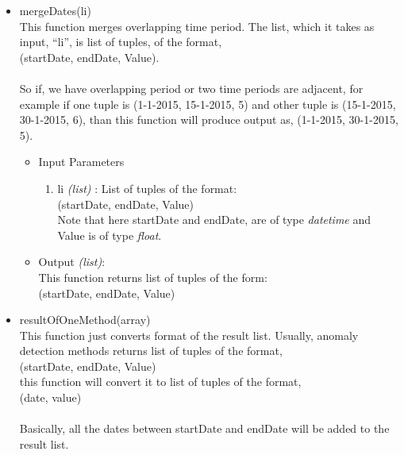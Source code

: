 \begin{itemize}
\begin{itemize}
 \end{itemize}
 
 
 
 
  \item mergeDates(li) \\
  
  
  This function merges overlapping time period. The list, which it takes as 
input, ``li'', is list of tuples, of the format, \\
  (startDate, endDate, Value). \\
  \\
  So if, we have overlapping period or two time periods are adjacent, for 
example if one tuple is (1-1-2015, 15-1-2015, 5) and other tuple is (15-1-2015, 
30-1-2015, 6), than this function will produce output as, 
(1-1-2015, 30-1-2015, 5).
  
  \begin{itemize}
 \item Input Parameters
 
 \begin{enumerate}
  \item li \textit{(list)} : List of tuples of the format: \\
  (startDate, endDate, Value) \\
  Note that here startDate and endDate, are of type \textit{datetime} and Value 
is of type \textit{float}.
 \end{enumerate}

 \item Output \textit{(list)}: \\
 This function returns list of tuples of the form: \\
 (startDate, endDate, Value)

 \end{itemize}
  
  
  
  
 \item resultOfOneMethod(array) \\
 
 
 This function just converts format of the result list. Usually, anomaly 
detection methods returns list of tuples of the format, \\ 
 (startDate, endDate, Value) \\
 this function will convert it to list of tuples of the format, \\
 (date, value) \\
 \\
 Basically, all the dates between startDate and endDate will be added to the 
result list.
 

\end{itemize}

